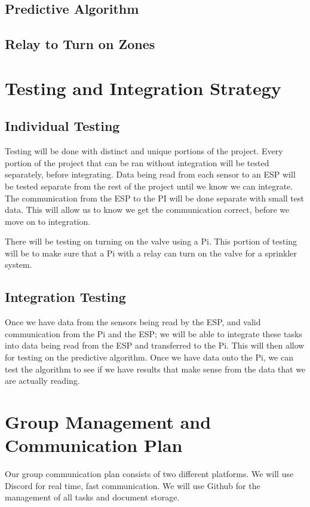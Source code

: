 \documentclass[letterpaper, 10 pt, conference]{ieeeconf}  %
\begin{document}
\subsection{Predictive Algorithm}

\subsection{Relay to Turn on Zones}

\section{Testing and Integration Strategy}
\subsection{Individual Testing}
Testing will be done with distinct and unique portions of the project. Every portion of the project that can be ran without integration will be tested separately, before integrating. Data being read from each sensor to an ESP will be tested separate from the rest of the project until we know we can integrate. The communication from the ESP to the PI will be done separate with small test data. This will allow us to know we get the communication correct, before we move on to integration. 

There will be testing on turning on the valve using a Pi. This portion of testing will be to make sure that a Pi with a relay can turn on the valve for a sprinkler system. 

\subsection{Integration Testing}
Once we have data from the sensors being read by the ESP, and valid communication from the Pi and the ESP; we will be able to integrate these tasks into data being read from the ESP and transferred to the Pi. This will then allow for testing on the predictive algorithm. Once we have data onto the Pi, we can test the algorithm to see if we have results that make sense from the data that we are actually reading. 

\section{Group Management and Communication Plan}
Our group communication plan consists of two different platforms. We will use Discord for real time, fast communication. We will use Github for the management of all tasks and document storage. 
\end{document}
